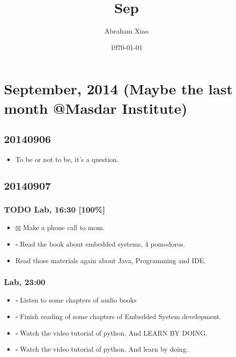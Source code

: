 \documentclass[11pt]{article}
\author{Abraham Xiao}
\date{\today}
\title{Sep}
\begin{document}
\maketitle
\tableofcontents

\section{September, 2014 (Maybe the last month @Masdar Institute)}
\label{sec-1}

\subsection{20140906}
\label{sec-1-1}
\begin{itemize}
\item To be or not to be, it's a question.
\end{itemize}


\subsection{20140907}
\label{sec-1-2}

\subsubsection{{\bfseries\sffamily TODO} Lab, 16:30 [100\%]}
\label{sec-1-2-1}
\begin{itemize}
\item $\boxtimes$ Make a phone call to mom.
\item $\square$ Read the book about embedded systems, 4 pomodoros.
\item Read those materials again about Java, Programming and IDE.
\end{itemize}

\subsubsection{Lab, 23:00}
\label{sec-1-2-2}
\begin{itemize}
\item $\square$ Listen to some chapters of audio books
\item $\square$ Finish reading of some chapters of Embedded System
development.
\item $\square$ Watch the video tutorial of python. And LEARN BY DOING.
\item $\square$ Watch the video tutorial of python. And learn by doing.
\end{itemize}
\end{document}
